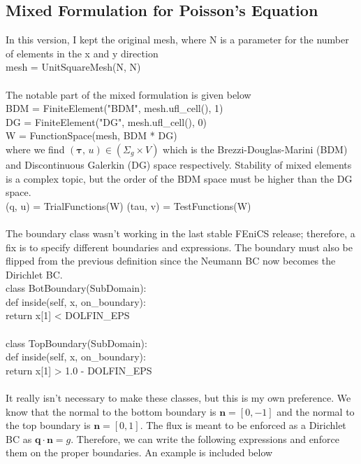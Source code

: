 \documentclass[12pt,3p]{article}
\begin{document}
\subsection{Mixed Formulation for Poisson's Equation}
\vspace{-1ex}
In this version, I kept the original mesh, where N is a parameter for the number of elements in the x and y direction \\
{\selectfont
mesh = UnitSquareMesh(N, N)  \\ \\
}
The notable part of the mixed formulation is given below \\
{\selectfont
BDM = FiniteElement("BDM", mesh.ufl\_cell(), 1) \\
DG  = FiniteElement("DG", mesh.ufl\_cell(), 0) \\
W = FunctionSpace(mesh, BDM * DG) \\
}
where we find $(\bm{\tau}, \, u) \in (\Sigma_g \times V)$ which is the Brezzi-Douglas-Marini (BDM) and Discontinuous Galerkin (DG) space respectively. Stability of mixed elements is a complex topic, but the order of the BDM space must be higher than the DG space.  \\
{\selectfont
(q, u) = TrialFunctions(W)
(tau, v) = TestFunctions(W) \\ \\
}
The boundary class wasn't working in the last stable FEniCS release; therefore, a fix is to specify different boundaries and expressions. The boundary must also be flipped from the previous definition since the Neumann BC now becomes the Dirichlet BC. \\
{\selectfont
class BotBoundary(SubDomain): \\
 \indent def inside(self, x, on\_boundary): \\
 \indent\indent       return x[1] < DOLFIN\_EPS \\ \\
class TopBoundary(SubDomain): \\
 \indent   def inside(self, x, on\_boundary): \\
  \indent \indent      return x[1] > 1.0 - DOLFIN\_EPS \\ \\
}
It really isn't necessary to make these classes, but this is my own preference. We know that the normal to the bottom boundary is $\mathbf{n} = [ 0, -1]$ and the normal to the top boundary is $\mathbf{n} = [ 0, 1]$. The flux is meant to be enforced as a Dirichlet BC as $\mathbf{q} \cdot \mathbf{n} = g $. Therefore, we can write the following expressions and enforce them on the proper boundaries. An example is included below \\
\end{document}

